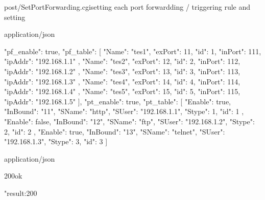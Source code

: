 \documentclass[12pt,a4paper]{article}
\begin{document}
\begin{apiRoute}{post}{/SetPortForwarding.cgi}{setting each port forwardding / triggering rule and setting}
	\begin{routeParameter}
	
	\end{routeParameter}
	\begin{routeRequest}{application/json}
		\begin{routeRequestBody}
{
  "pf_enable": true,
  "pf_table": [
    {
      "Name": "tes1",
      "exPort": 11,
      "id": 1,
      "inPort": 111,
      "ipAddr": "192.168.1.1"
    },
    {
      "Name": "tes2",
      "exPort": 12,
      "id": 2,
      "inPort": 112,
      "ipAddr": "192.168.1.2"
    },
    {
      "Name": "tes3",
      "exPort": 13,
      "id": 3,
      "inPort": 113,
      "ipAddr": "192.168.1.3"
    },
    {
      "Name": "tes4",
      "exPort": 14,
      "id": 4,
      "inPort": 114,
      "ipAddr": "192.168.1.4"
    },
    {
      "Name": "tes5",
      "exPort": 15,
      "id": 5,
      "inPort": 115,
      "ipAddr": "192.168.1.5"
    }
  ],
  "pt_enable": true,
  "pt_table": [
    {
      "Enable": true,
      "InBound": "11",
      "SName": "http",
      "SUser": "192.168.1.1",
      "Stype": 1,
      "id": 1
    },
    {
      "Enable": false,
      "InBound": "12",
      "SName": "ftp",
      "SUser": "192.168.1.2",
      "Stype": 2,
      "id": 2
    },
    {
      "Enable": true,
      "InBound": "13",
      "SName": "telnet",
      "SUser": "192.168.1.3",
      "Stype": 3,
      "id": 3
    }
  ]
}
		\end{routeRequestBody}
	\end{routeRequest}
	\begin{routeResponse}{application/json}
		\begin{routeResponseItem}{200}{ok}
			\begin{routeResponseItemBody}
{     
	"result:200
}
			\end{routeResponseItemBody}
		\end{routeResponseItem}
	\end{routeResponse}
\end{apiRoute}
\end{document}
